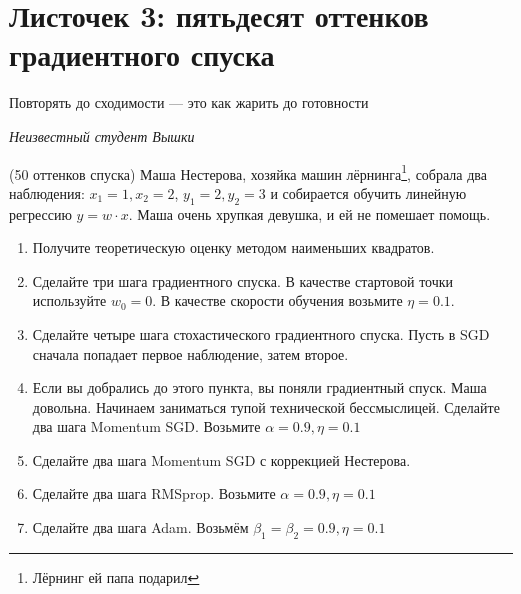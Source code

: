 
\section*{Листочек 3: пятьдесят оттенков градиентного спуска}

\epigraph{Повторять до сходимости --- это как жарить до готовности}{\textit{Неизвестный студент Вышки}}

\begin{problem}{(50 оттенков спуска)}
	Маша Нестерова, хозяйка машин лёрнинга\footnote{Лёрнинг ей папа подарил},  собрала два наблюдения: $x_1 = 1, x_2 = 2$, $y_1 = 2, y_2 = 3$ и собирается обучить линейную регрессию $y = w \cdot x$.  Маша очень хрупкая девушка, и ей не помешает помощь. 

	\begin{enumerate}
		\item Получите теоретическую оценку методом наименьших квадратов.
		
		\item  Сделайте три шага градиентного спуска. В качестве стартовой точки используйте $w_0 = 0$.  В качестве скорости обучения возьмите $\eta = 0.1$. 
		
		\item Сделайте четыре шага стохастического градиентного спуска.  Пусть в SGD сначала попадает первое наблюдение, затем второе. 
		
		\item Если вы добрались до этого пункта, вы поняли градиентный спуск. Маша довольна. Начинаем заниматься тупой технической бессмыслицей. Сделайте два шага Momentum SGD. Возьмите $\alpha = 0.9, \eta = 0.1$
		
		\item  Сделайте два шага Momentum SGD с коррекцией Нестерова. 
		
		\item Сделайте два шага RMSprop.  Возьмите $\alpha = 0.9, \eta = 0.1$
		
		\item  Сделайте два шага Adam. Возьмём  $\beta_1 = \beta_2 = 0.9, \eta = 0.1$		
	\end{enumerate}
\end{problem}

